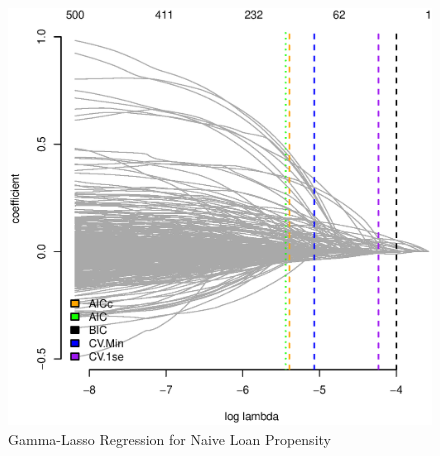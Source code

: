 \documentclass[11pt, fleqn]{article}
\begin{document}


\begin{figure}[!htb]
  \centering
  \includegraphics[scale=.5]{naive_aic.eps}
  \caption{Gamma-Lasso Regression for Naive Loan Propensity}
  \label{fig:naive_aic}
\end{figure}


\end{document}
